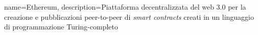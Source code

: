 {
	name={Ethereum},
	description={Piattaforma decentralizzata del web 3.0 per la creazione e pubblicazioni peer-to-peer di \textit{smart contracts} creati in un linguaggio di programmazione Turing-completo}
}